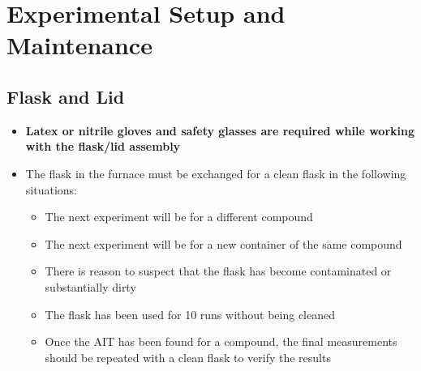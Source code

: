 \documentclass[letterpaper,11pt]{article}
\begin{document}
\newpage
 
\section{Experimental Setup and Maintenance}
    \subsection{Flask and Lid}
    \begin{itemize}
    \item \textbf{Latex or nitrile gloves and safety glasses are 
            required while working with the flask/lid assembly}
    \item The flask in the furnace must be exchanged for a clean flask in the 
        following situations:
        \begin{itemize}
        \item The next experiment will be for a different compound
        \item The next experiment will be for a new container of the same 
            compound
        \item There is reason to suspect that the flask has become 
            contaminated or substantially dirty
        \item The flask has been used for 10 runs without being cleaned
        \item Once the AIT has been found for a compound, the final measurements
            should be repeated with a clean flask to verify the results
        \end{itemize}
    

\end{itemize}
\end{document}
